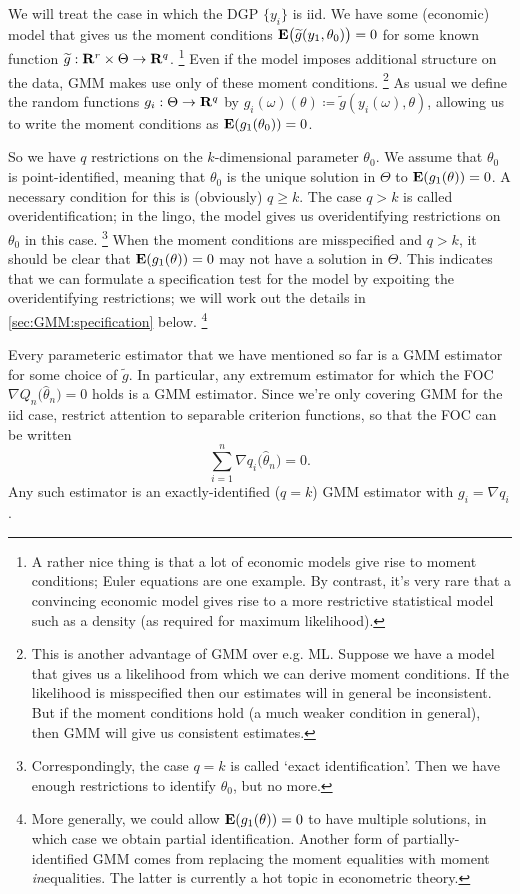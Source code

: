 \documentclass[11pt,letterpaper,reqno,oneside]{article}
\begin{document}
We will treat the case in which the DGP $\{ y_i \}$ is iid. We have some (economic) model that gives us the moment conditions $\mathbf{E}\bigl( \widetilde{g}(y_1,\theta_0) \bigr) = 0$ for some known function $\widetilde{g} : \mathbf{R}^r \times \Theta \to \mathbf{R}^q$.%
	\footnote{A rather nice thing is that a lot of economic models give rise to moment conditions; Euler equations are one example. By contrast, it's very rare that a convincing economic model gives rise to a more restrictive statistical model such as a density (as required for maximum likelihood).}
Even if the model imposes additional structure on the data, GMM makes use only of these moment conditions.%
	\footnote{This is another advantage of GMM over e.g. ML. Suppose we have a model that gives us a likelihood from which we can derive moment conditions. If the likelihood is misspecified then our estimates will in general be inconsistent. But if the moment conditions hold (a much weaker condition in general), then GMM will give us consistent estimates.}
As usual we define the random functions $g_i : \Theta \to \mathbf{R}^q$ by $g_i(\omega)(\theta) \coloneqq \widetilde{g}(y_i(\omega),\theta)$, allowing us to write the moment conditions as $\mathbf{E}( g_1(\theta_0) ) = 0$.

So we have $q$ restrictions on the $k$-dimensional parameter $\theta_0$. We assume that $\theta_0$ is point-identified, meaning that $\theta_0$ is the unique solution in $\Theta$ to $\mathbf{E}( g_1(\theta) ) = 0$. A necessary condition for this is (obviously) $q \geq k$. The case $q > k$ is called overidentification; in the lingo, the model gives us overidentifying restrictions on $\theta_0$ in this case.%
	\footnote{Correspondingly, the case $q=k$ is called `exact identification'. Then we have enough restrictions to identify $\theta_0$, but no more.}
When the moment conditions are misspecified and $q>k$, it should be clear that $\mathbf{E}( g_1(\theta) ) = 0$ may not have a solution in $\Theta$. This indicates that we can formulate a specification test for the model by expoiting the overidentifying restrictions; we will work out the details in \cref{sec:GMM:specification} below.%
	\footnote{More generally, we could allow $\mathbf{E}( g_1(\theta) ) = 0$ to have multiple solutions, in which case we obtain partial identification. Another form of partially-identified GMM comes from replacing the moment equalities with moment \emph{in}equalities. The latter is currently a hot topic in econometric theory.}

Every parameteric estimator that we have mentioned so far is a GMM estimator for some choice of $\widetilde{g}$. In particular, any extremum estimator for which the FOC $\nabla Q_n\bigl( \widehat{\theta}_n \bigr) = 0$ holds is a GMM estimator. Since we're only covering GMM for the iid case, restrict attention to separable criterion functions, so that the FOC can be written
%
\begin{equation*}
	\sum_{i=1}^n \nabla q_i\bigl( \widehat{\theta}_n \bigr) = 0 .
\end{equation*}
%
Any such estimator is an exactly-identified ($q=k$) GMM estimator with $g_i = \nabla q_i$.
\end{document}
